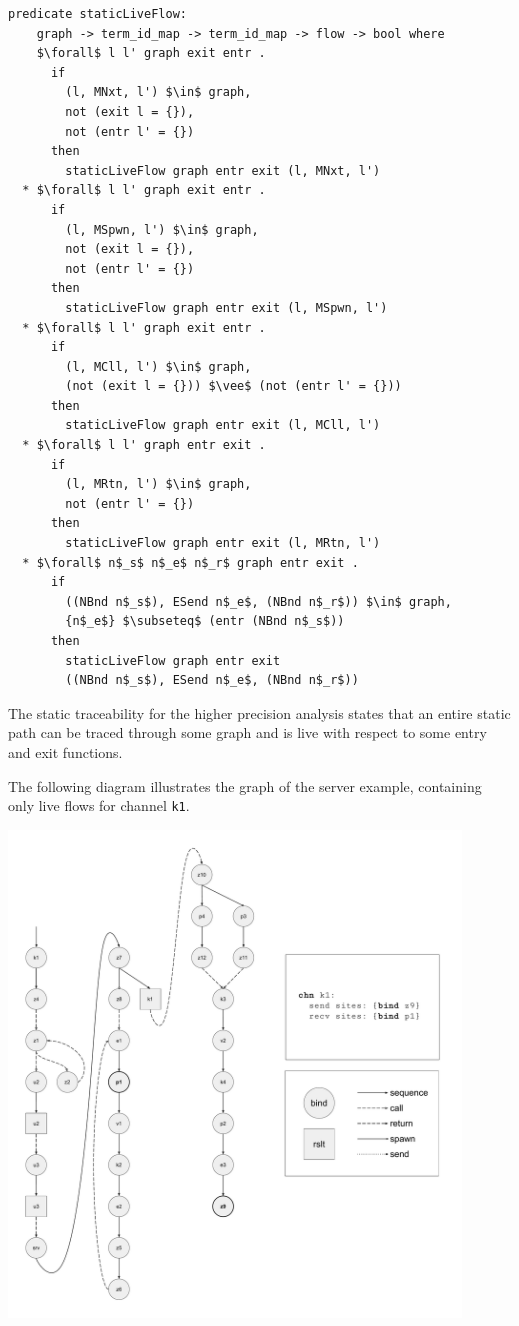 \documentclass[letterpaper, 11pt]{extarticle}
\begin{document}
\begin{lstlisting}[language=logic, mathescape]
  predicate staticLiveFlow:
    graph -> term_id_map -> term_id_map -> flow -> bool where
    $\forall$ l l' graph exit entr . 
      if
        (l, MNxt, l') $\in$ graph,
        not (exit l = {}),
        not (entr l' = {})
      then
        staticLiveFlow graph entr exit (l, MNxt, l')
  * $\forall$ l l' graph exit entr .
      if
        (l, MSpwn, l') $\in$ graph, 
        not (exit l = {}),
        not (entr l' = {})
      then
        staticLiveFlow graph entr exit (l, MSpwn, l')
  * $\forall$ l l' graph exit entr .
      if
        (l, MCll, l') $\in$ graph,
        (not (exit l = {})) $\vee$ (not (entr l' = {}))
      then
        staticLiveFlow graph entr exit (l, MCll, l')
  * $\forall$ l l' graph entr exit .
      if
        (l, MRtn, l') $\in$ graph,
        not (entr l' = {})
      then
        staticLiveFlow graph entr exit (l, MRtn, l')
  * $\forall$ n$_s$ n$_e$ n$_r$ graph entr exit .
      if
        ((NBnd n$_s$), ESend n$_e$, (NBnd n$_r$)) $\in$ graph, 
        {n$_e$} $\subseteq$ (entr (NBnd n$_s$))
      then
        staticLiveFlow graph entr exit
        ((NBnd n$_s$), ESend n$_e$, (NBnd n$_r$))
\end{lstlisting}

The static traceability for the higher precision analysis states
that an entire static path can be traced through some graph and
is live with respect to some entry and exit functions.

The following diagram illustrates the graph of the server example,
containing only live flows for channel \lstinline{k1}. \

\includegraphics[width=0.9\textwidth]{cml-graph-k1.pdf}
\end{document}
